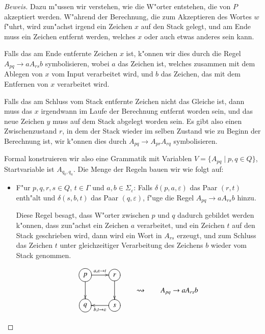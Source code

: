\begin{proof}[Beweis]
Dazu m"ussen wir verstehen, wie die W"orter entstehen, die von $P$
akzeptiert werden. W"ahrend der Berechnung, die zum Akzeptieren des
Wortes $w$ f"uhrt, wird zun"achst
irgend ein Zeichen $x$ auf den Stack gelegt, und am Ende muss ein
Zeichen entfernt werden, welches $x$ oder auch etwas anderes sein kann.

Falls das am Ende entfernte Zeichen $x$ ist, k"onnen wir dies durch
die Regel $A_{pq}\to aA_{rs}b$ symbolisieren, wobei $a$ das Zeichen
ist, welches zusammen mit dem Ablegen von $x$ vom Input verarbeitet wird,
und $b$ das Zeichen, das mit dem Entfernen von $x$ verarbeitet wird.

Falls das am Schluss vom Stack entfernte Zeichen nicht das Gleiche ist,
dann muss das $x$ irgendwann im Laufe der Berechnung entfernt worden
sein, und das neue Zeichen $y$ muss auf dem Stack abgelegt worden
sein. Es gibt also einen Zwischenzustand $r$, in dem der Stack
wieder im selben Zustand wie zu
Beginn der Berechnung ist, wir k"onnen dies durch
$A_{pq}\to A_{pr}A_{rq}$ symbolisieren.

Formal konstruieren wir also eine Grammatik mit Variablen
$V=\{A_{pq}\;|\; p,q\in Q\}$, Startvariable ist $A_{q_0,q_a}$.
Die Menge der Regeln bauen wir wie folgt auf:
\begin{itemize}
\item F"ur $p,q,r,s\in Q$, $t\in\Gamma$ und $a,b\in\Sigma_{\varepsilon}$:
Falls $\delta(p,a,\varepsilon)$ das Paar $(r,t)$ enth"alt
und $\delta(s,b,t)$ das Paar $(q,\varepsilon)$, f"uge die Regel
$A_{pq}\to aA_{rs}b$ hinzu.

Diese Regel besagt, dass W"orter zwischen $p$ und $q$ dadurch gebildet
werden k"onnen, dass zun"achst ein Zeichen $a$ verarbeitet, und
ein Zeichen $t$ auf den Stack geschrieben wird, dann wird ein Wort
in $A_{rs}$ erzeugt, und zum Schluss das Zeichen $t$ unter
gleichzeitiger Verarbeitung des Zeichens $b$ wieder vom Stack
genommen.

\[
\begin{gathered}

\entrymodifiers={++[o][F]}
\xymatrix{
{p}\ar[d]\ar[r]^{a,\varepsilon\to t}
	&{r}\ar[d]
\\
{q}
	&{s}\ar[l]^{b,t\to\varepsilon}
}
\end{gathered}

\qquad\rightsquigarrow\qquad A_{pq}\to aA_{rs}b
\]


\end{itemize}
\end{proof}
